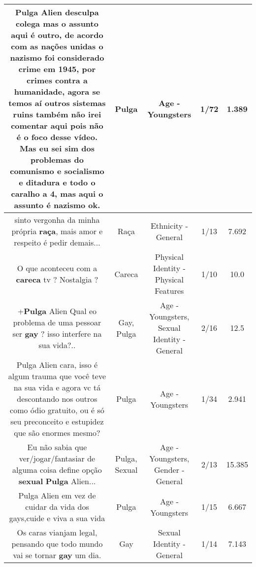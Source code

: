 \documentclass[11pt]{article}
\newlength\mylength
\begin{document}
\begin{center}
\begin{longtable}{|C{.65\mylength}|C{.30\mylength}|C{.12\mylength}|C{.12\mylength}|C{.12\mylength}|}
  \small Pulga Alien desculpa colega mas o assunto aqui é outro, de acordo com as nações unidas o nazismo foi considerado crime em 1945, por crimes contra a humanidade, agora se temos aí outros sistemas ruins também não irei comentar aqui pois não é o foco desse vídeo. Mas eu sei sim dos problemas do comunismo e socialismo e ditadura e todo o caralho a 4, mas aqui o assunto é nazismo ok.\normalsize   & Pulga & Age - Youngsters & 1/72 & 1.389 \\  \hline
  \small sinto vergonha da minha própria \textbf{raça}, mais amor e respeito é pedir demais...\normalsize   & Raça & Ethnicity - General & 1/13 & 7.692 \\  \hline
  \small O que aconteceu com a \textbf{careca} tv ? Nostalgia ?\normalsize   & Careca & Physical Identity - Physical Features & 1/10 & 10.0 \\  \hline
  \small +\textbf{Pulga} Alien Qual eo problema de uma pessoar ser \textbf{gay} ? isso interfere na sua vida?..\normalsize   & Gay, Pulga & Age - Youngsters, Sexual Identity - General & 2/16 & 12.5 \\  \hline
  \small Pulga Alien cara, isso é algum trauma que você teve na sua vida e agora vc tá descontando nos outros como ódio gratuito, ou é só seu preconceito e estupidez que são enormes mesmo?\normalsize   & Pulga & Age - Youngsters & 1/34 & 2.941 \\  \hline
  \small Eu não sabia que ver/jogar/fantasiar de alguma coisa define opção \textbf{sexual} \textbf{Pulga} Alien...\normalsize   & Pulga, Sexual & Age - Youngsters, Gender - General & 2/13 & 15.385 \\  \hline
  \small Pulga Alien em vez de cuidar da vida dos gays,cuide e viva a sua vida\normalsize   & Pulga & Age - Youngsters & 1/15 & 6.667 \\  \hline
  \small Os caras vianjam legal, pensando que todo mundo vai se tornar \textbf{gay} um dia.\normalsize   & Gay & Sexual Identity - General & 1/14 & 7.143 \\  \hline

\end{longtable}
\end{center}
\end{document}
